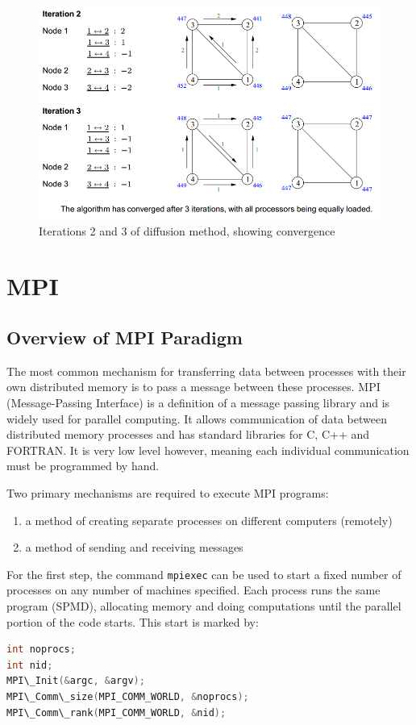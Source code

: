 \documentclass{article}
\begin{document}
\begin{figure}[H]
	\centering
	\includegraphics[scale=0.5]{figures/diffusion-method-example3.png}
	\caption{Iterations 2 and 3 of diffusion method, showing convergence}
	\label{fig:diffusion-method-example3}
\end{figure}

\section{MPI}

\subsection{Overview of MPI Paradigm}

The most common mechanism for transferring data between processes with their own distributed memory is to pass a message between these processes. MPI (Message-Passing Interface) is a definition of a message passing library and is widely used for parallel computing. It allows communication of data between distributed memory processes and has standard libraries for C, C++ and FORTRAN. It is very low level however, meaning each individual communication must be programmed by hand.

Two primary mechanisms are required to execute MPI programs:
\begin{enumerate}
	\item a method of creating separate processes on different computers (remotely)
	\item a method of sending and receiving messages
\end{enumerate}
For the first step, the command \texttt{mpiexec} can be used to start a fixed number of processes on any number of machines specified. Each process runs the same program (SPMD), allocating memory and doing computations until the parallel portion of the code starts. This start is marked by:
\begin{lstlisting}[language=C,frame=single]
int noprocs;
int nid;
MPI\_Init(&argc, &argv);
MPI\_Comm\_size(MPI_COMM_WORLD, &noprocs);
MPI\_Comm\_rank(MPI_COMM_WORLD, &nid);
\end{lstlisting}
\end{document}
